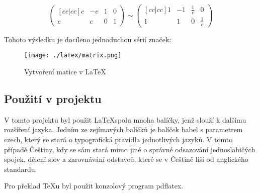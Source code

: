 \documentclass[main.tex]{subfiles}
\begin{document}
$$
\begin{pmatrix}[cc|cc]
	c & -c & 1 & 0 \\
	c & c & 0 & 1 
\end{pmatrix}
\sim
\begin{pmatrix}[cc|cc]
	1 & -1 & \frac{1}{c} & 0 \\
	1 & 1 & 0 & \frac{1}{c} 
\end{pmatrix}
$$

Tohoto výsledku je docíleno jednoduchou sérií značek: %
		\begin{figure}[h]
			\centering
			\texttt{[image: ./latex/matrix.png]}
			\caption{Vytvoření matice v \LaTeX}
		\end{figure}

\subsection{Použití v projektu}
V tomto projektu byl použit \LaTeX spolu mnoha balíčky, jenž slouží k dalšímu rozšíření jazyka. Jedním ze zejímavých balíčků je balíček babel s parametrem czech, který se stará o typografická pravidla jednotlivých jazyků. V tomto případě Češtiny, kdy se sám stará mimo jiné o správné odsazování jednoslabičých spojek, dělení slov a zarovnávání odstavců, které se v Češtině liší od anglického standardu. 

Pro překlad TeXu byl použit konzolový program pdflatex.
\end{document}
